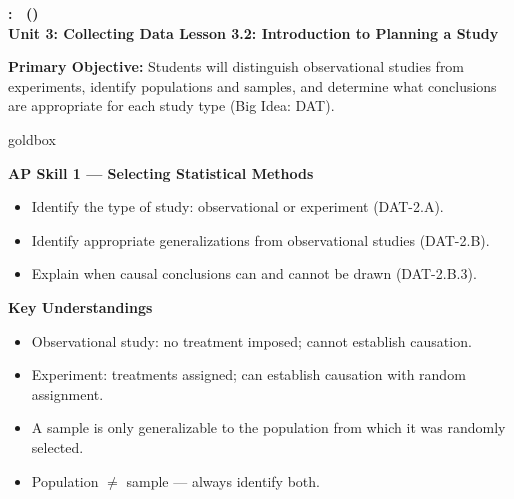 \documentclass[10pt]{article}
\newcommand{\UnitNumberName}{Unit 3: Collecting Data \quad}
\newcommand{\LessonNumberName}{Lesson 3.2: Introduction to Planning a Study}
\begin{document}
\begin{center}
    {\Large\bfseries \CourseName: \SchoolYear\ (\MeetingLength) \\
    {\small\bfseries \UnitNumberName \LessonNumberName}}
\end{center}

\begin{tcolorbox}[colback=sky, colframe=navy, boxrule=0.9pt, arc=2mm,
    left=2mm, right=2mm, top=1.5mm, bottom=1.5mm]
    \textbf{Primary Objective:} Students will distinguish observational studies from
    experiments, identify populations and samples, and determine what conclusions are
    appropriate for each study type (Big Idea: DAT).
\end{tcolorbox}

\renewcommand{\arraystretch}{1.6}
\begin{skillbox}{goldbox}
\begin{minipage}[t]{0.48\linewidth}
    \textbf{AP Skill 1 --- Selecting Statistical Methods}
    \begin{itemize}
        \item Identify the type of study: observational or experiment (DAT-2.A).
        \item Identify appropriate generalizations from observational studies (DAT-2.B).
        \item Explain when causal conclusions can and cannot be drawn (DAT-2.B.3).
    \end{itemize}
\end{minipage}
\hfill
\begin{minipage}[t]{0.48\linewidth}
    \textbf{Key Understandings}
    \begin{itemize}
        \item Observational study: no treatment imposed; cannot establish causation.
        \item Experiment: treatments assigned; can establish causation with random
              assignment.
        \item A sample is only generalizable to the population from which it was
              randomly selected.
        \item Population $\neq$ sample --- always identify both.
    \end{itemize}
\end{minipage}
\end{skillbox}
\end{document}
